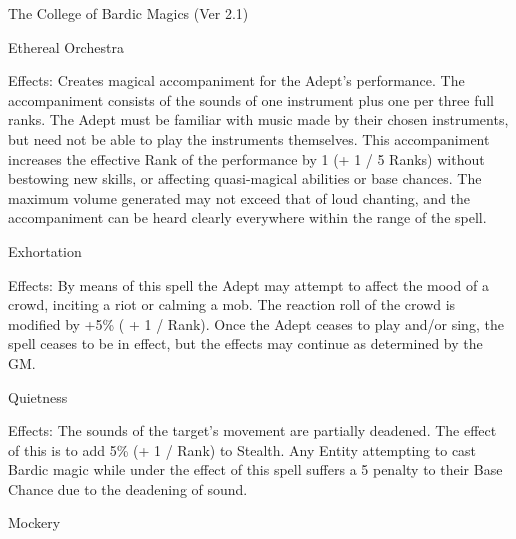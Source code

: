 \begin{Chapter}{The College of Bardic Magics (Ver 2.1)}
\begin{spell}[G-3]{Ethereal Orchestra }

Effects:  Creates  magical  accompaniment  for  the 
Adept’s performance. The accompaniment consists 
of the sounds of one instrument plus one per three 
full ranks. The Adept must be familiar with music 
made by their chosen instruments, but need not be 
able  to  play  the  instruments  themselves.  This  accompaniment  increases  the  effective  Rank  of  the 
performance by 1 (+ 1 / 5 Ranks) without bestowing  new  skills,  or  affecting  quasi-magical  abilities 
or  base  chances.  The  maximum  volume  generated 
may  not  exceed  that  of  loud  chanting,  and  the 
accompaniment  can  be  heard  clearly  everywhere 
within the range of the spell. 
\end{spell}


\begin{spell}[G-4]{Exhortation }

Effects:  By  means  of  this  spell  the  Adept  may 
attempt  to  affect  the  mood  of  a  crowd,  inciting  a 
riot  or  calming  a  mob.  The  reaction  roll  of  the 
crowd is modified by +5\% ( + 1 / Rank). Once the 
Adept ceases to play and/or sing, the spell ceases to 
be in effect, but the effects may continue as determined by the GM. 
\end{spell}

\begin{spell}[G-5]{Quietness }

Effects:  The  sounds  of  the  target’s  movement  are 
partially deadened. The effect of this is to add 5\% 
(+  1  /  Rank)  to  Stealth.  Any  Entity  attempting  to 
cast  Bardic  magic  while  under  the  effect  of  this 
spell  suffers  a  5  penalty  to  their  Base  Chance  due 
to the deadening of sound. 
\end{spell}

\begin{spell}[G-6]{Mockery }


\end{spell}
\end{Chapter}

